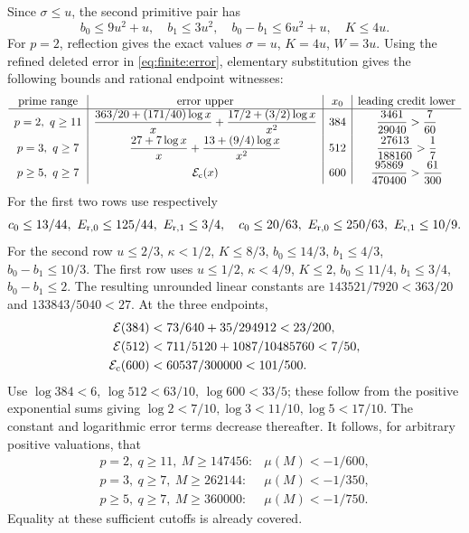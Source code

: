 \documentclass[11pt]{article}
\theoremstyle{definition}\newtheorem{definition}[theorem]{Definition}
\theoremstyle{remark}\newtheorem{remark}[theorem]{Remark}
\begin{document}
Since \(\sigma\le u\), the second primitive pair has
\[
 b_0\le9u^2+u,\quad b_1\le3u^2,\quad
 b_0-b_1\le6u^2+u,\quad K\le4u .
\]
For \(p=2\), reflection gives the exact values
\(\sigma=u\), \(K=4u\), \(W=3u\).
Using the refined deleted error in \eqref{eq:finite:error}, elementary
substitution gives the following bounds and rational endpoint witnesses:
\[
\begin{array}{c|c|c|c}
\hbox{prime range}&\hbox{error upper}&x_0&
                   \hbox{leading credit lower}\\ \hline
p=2,\ q\ge11&
\dfrac{363/20+(171/40)\log x}{x}
 +\dfrac{17/2+(3/2)\log x}{x^2}&384&
\dfrac{3461}{29040}>\dfrac7{60}\\[5pt]
p=3,\ q\ge7&
\dfrac{27+7\log x}{x}
 +\dfrac{13+(9/4)\log x}{x^2}&512&
\dfrac{27613}{188160}>\dfrac17\\[5pt]
p\ge5,\ q\ge7&{\cal E}_{\rm c}(x)&600&
\dfrac{95869}{470400}>\dfrac{61}{300}
\end{array}
\]
For the first two rows use respectively
\[
 c_0\le13/44,\ E_{{\rm r},0}\le125/44,\ E_{{\rm r},1}\le3/4,
 \quad
 c_0\le20/63,\ E_{{\rm r},0}\le250/63,\
 E_{{\rm r},1}\le10/9 .
\]
For the second row \(u\le2/3\), \(\kappa<1/2\),
\(K\le8/3\), \(b_0\le14/3\), \(b_1\le4/3\),
\(b_0-b_1\le10/3\).  The first row uses
\(u\le1/2\), \(\kappa<4/9\), \(K\le2\),
\(b_0\le11/4\), \(b_1\le3/4\), \(b_0-b_1\le2\).
The resulting unrounded linear constants are
\(143521/7920<363/20\) and \(133843/5040<27\).
At the three endpoints,
\[
\begin{split}
 {\cal E}(384)&<73/640+35/294912<23/200,\\
 {\cal E}(512)&<711/5120+1087/10485760<7/50,\\
 {\cal E}_{\rm c}(600)&<60537/300000<101/500.
\end{split}
\]
Use \(\log384<6\), \(\log512<63/10\), \(\log600<33/5\);
these follow from the positive exponential sums giving
\(\log2<7/10,\log3<11/10,\log5<17/10\).
The constant and logarithmic error terms decrease thereafter.
It follows, for arbitrary positive valuations, that
\begin{equation}
 \begin{array}{ll}
 p=2,\ q\ge11,\ M\ge147456:&\mu(M)<-1/600,\\
 p=3,\ q\ge7,\ M\ge262144:&\mu(M)<-1/350,\\
 p\ge5,\ q\ge7,\ M\ge360000:&\mu(M)<-1/750.
 \end{array} \label{eq:finite:cutoffs}
\end{equation}
Equality at these sufficient cutoffs is already covered.
\end{document}
